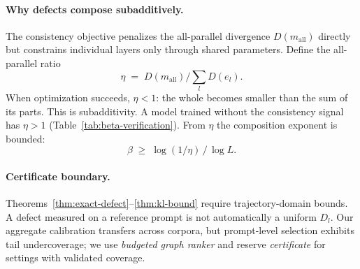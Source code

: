 \paragraph{Why defects compose subadditively.}
The consistency objective penalizes the all-parallel divergence $D(m_{\mathrm{all}})$ directly but constrains individual layers only through shared parameters. Define the all-parallel ratio
\begin{equation}
  \eta \;=\; D(m_{\mathrm{all}})\big/\textstyle\sum_l D(e_l).
  \label{eq:eta}
\end{equation}
When optimization succeeds, $\eta<1$: the whole becomes smaller than the sum of its parts. This is subadditivity. A model trained without the consistency signal has $\eta>1$ (Table~\ref{tab:beta-verification}). From $\eta$ the composition exponent is bounded:
\begin{equation}
  \beta \;\ge\; \log(1/\eta)\,/\,\log L.
  \label{eq:beta-lower}
\end{equation}

\paragraph{Certificate boundary.}
Theorems~\ref{thm:exact-defect}--\ref{thm:kl-bound} require trajectory-domain bounds. A defect measured on a reference prompt is not automatically a uniform $D_l$. Our aggregate calibration transfers across corpora, but prompt-level selection exhibits tail undercoverage; we use \emph{budgeted graph ranker} and reserve \emph{certificate} for settings with validated coverage.
